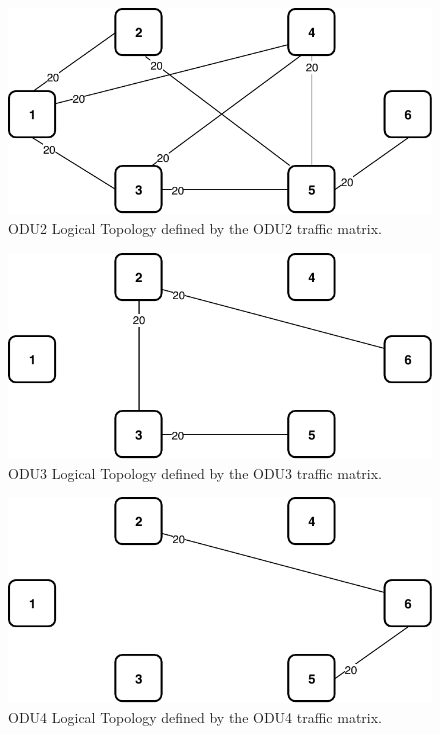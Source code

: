 \begin{figure}[h!]
\centering
\includegraphics[width=12cm]{sdf/ilp/opaque_protection/figures/logical_topology_ODU2_high}
\caption{ODU2 Logical Topology defined by the ODU2 traffic matrix.}
\label{logical_ODU2_protectionhigh}
\end{figure}

\begin{figure}[h!]
\centering
\includegraphics[width=12cm]{sdf/ilp/opaque_protection/figures/logical_topology_ODU3_high}
\caption{ODU3 Logical Topology defined by the ODU3 traffic matrix.}
\label{logical_ODU3_protectionhigh}
\end{figure}

\begin{figure}[h!]
\centering
\includegraphics[width=12cm]{sdf/ilp/opaque_protection/figures/logical_topology_ODU4_high}
\caption{ODU4 Logical Topology defined by the ODU4 traffic matrix.}
\label{logical_ODU4_protectionhigh}
\end{figure}


